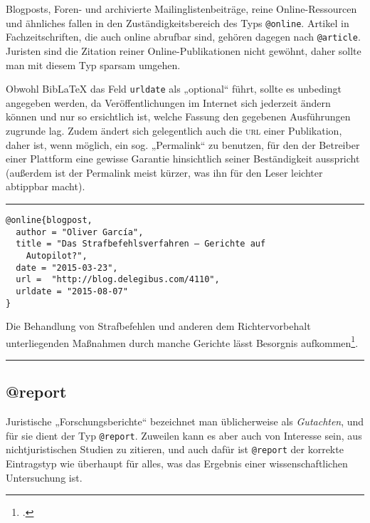 \documentclass[11pt,a4paper,DIV=calc]{scrartcl}
\newcommand\software[1]{\textsf{#1}}
\newcommand\Biblatex{\software{Bib\LaTeX{}}\xspace}
\newcommand\abbrev[1]{\textsc{#1}}
\newenvironment{rubexample}{\par\vspace{\baselineskip}\hrule\par\begin{refsection}}{\end{refsection}\par\hrule\par\vspace{\baselineskip}}
\begin{document}
Blogposts, Foren- und archivierte Mailinglistenbeiträge, reine
On\-line-Res\-sour\-cen und ähnliches fallen in den
Zuständigkeitsbereich des Typs \verb+@online+. Artikel in
Fachzeitschriften, die auch online abrufbar sind, gehören dagegen nach
\verb+@article+. Juristen sind die Zitation reiner
On\-line-Pu\-bli\-ka\-tio\-nen nicht gewöhnt, daher sollte man mit
diesem Typ sparsam umgehen.

Obwohl \Biblatex das Feld \verb+urldate+ als „optional“ führt, sollte
es unbedingt angegeben werden, da Veröffentlichungen im Internet sich
jederzeit ändern können und nur so ersichtlich ist, welche Fassung den
gegebenen Ausführungen zugrunde lag. Zudem ändert sich gelegentlich
auch die \abbrev{url} einer Publikation, daher ist, wenn möglich, ein
sog. „Permalink“ zu benutzen, für den der Betreiber einer Plattform
eine gewisse Garantie hinsichtlich seiner Beständigkeit ausspricht
(außerdem ist der Permalink meist kürzer, was ihn für den Leser
leichter abtippbar macht).

\begin{rubexample}
\begin{verbatim}
@online{blogpost,
  author = "Oliver García",
  title = "Das Strafbefehlsverfahren — Gerichte auf
    Autopilot?",
  date = "2015-03-23",
  url =  "http://blog.delegibus.com/4110",
  urldate = "2015-08-07"
}
\end{verbatim}

Die Behandlung von Strafbefehlen und anderen dem Richtervorbehalt
unterliegenden Maßnahmen durch manche Gerichte lässt Besorgnis
aufkommen\footcite{blogpost}.

\printbibliography
\end{rubexample}

\subsection{@report}

Juristische „Forschungsberichte“ bezeichnet man üblicherweise als
\emph{Gutachten}, und für sie dient der Typ \verb+@report+. Zuweilen
kann es aber auch von Interesse sein, aus nichtjuristischen Studien zu
zitieren, und auch dafür ist \verb+@report+ der korrekte Eintragstyp
wie überhaupt für alles, was das Ergebnis einer wissenschaftlichen
Untersuchung ist.
\end{document}
